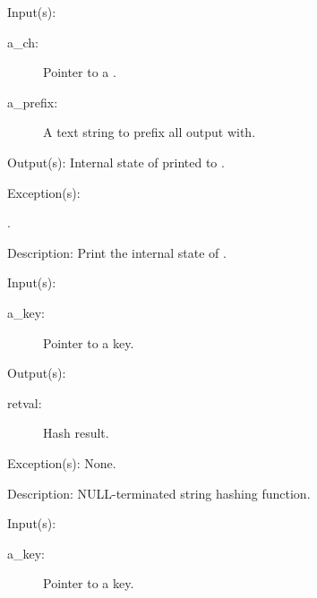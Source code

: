 \begin{capi}
	\begin{capilist}
	\item[Input(s): ]
		\begin{description}\item[]
		\item[a\_ch: ]
			Pointer to a .
		\item[a\_prefix: ]
			A text string to prefix all output with.
		\end{description}
	\item[Output(s): ]
		Internal state of  printed to .
	\item[Exception(s): ]
		\begin{description}\item[]
		\item[.]
		\end{description}
	\item[Description: ]
		Print the internal state of .
	\end{capilist}
\label{ch_string_hash}
	\begin{capilist}
	\item[Input(s): ]
		\begin{description}\item[]
		\item[a\_key: ]
			Pointer to a key.
		\end{description}
	\item[Output(s): ]
		\begin{description}\item[]
		\item[retval: ]
			Hash result.
		\end{description}
	\item[Exception(s): ] None.
	\item[Description: ]
		NULL-terminated string hashing function.
	\end{capilist}
\label{ch_direct_hash}
	\begin{capilist}
	\item[Input(s): ]
		\begin{description}\item[]
		\item[a\_key: ]
			Pointer to a key.
		\end{description}

\end{capilist}
\end{capi}
